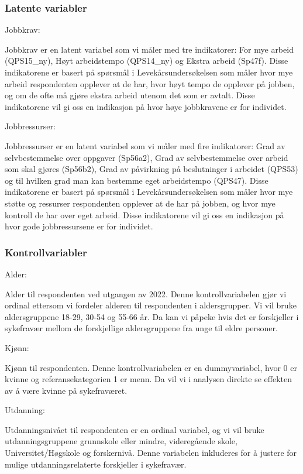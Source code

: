 \documentclass[
  12pt,
  a4paper,
  DIV=11,
  numbers=noendperiod]{scrartcl}
\begin{document}
\subsubsection{Latente variabler}\label{latente-variabler}

Jobbkrav:

Jobbkrav er en latent variabel som vi måler med tre indikatorer: For mye
arbeid (QPS15\_ny), Høyt arbeidstempo (QPS14\_ny) og Ekstra arbeid
(Sp47f). Disse indikatorene er basert på spørsmål i
Levekårsundersøkelsen som måler hvor mye arbeid respondenten opplever at
de har, hvor høyt tempo de opplever på jobben, og om de ofte må gjøre
ekstra arbeid utenom det som er avtalt. Disse indikatorene vil gi oss en
indikasjon på hvor høye jobbkravene er for individet.

Jobbressurser:

Jobbressurser er en latent variabel som vi måler med fire indikatorer:
Grad av selvbestemmelse over oppgaver (Sp56a2), Grad av selvbestemmelse
over arbeid som skal gjøres (Sp56b2), Grad av påvirkning på beslutninger
i arbeidet (QPS53) og til hvilken grad man kan bestemme eget
arbeidstempo (QPS47). Disse indikatorene er basert på spørsmål i
Levekårsundersøkelsen som måler hvor mye støtte og ressurser
respondenten opplever at de har på jobben, og hvor mye kontroll de har
over eget arbeid. Disse indikatorene vil gi oss en indikasjon på hvor
gode jobbressursene er for individet.

\subsubsection{Kontrollvariabler}\label{kontrollvariabler}

Alder:

Alder til respondenten ved utgangen av 2022. Denne kontrollvariabelen
gjør vi ordinal ettersom vi fordeler alderen til respondenten i
aldersgrupper. Vi vil bruke aldersgruppene 18-29, 30-54 og 55-66 år. Da
kan vi påpeke hvis det er forskjeller i sykefravær mellom de
forskjellige aldersgruppene fra unge til eldre personer.

Kjønn:

Kjønn til respondenten. Denne kontrollvariabelen er en dummyvariabel,
hvor 0 er kvinne og referansekategorien 1 er menn. Da vil vi i analysen
direkte se effekten av å være kvinne på sykefraværet.

Utdanning:

Utdanningsnivået til respondenten er en ordinal variabel, og vi vil
bruke utdanningsgruppene grunnskole eller mindre, videregående skole,
Universitet/Høgskole og forskernivå. Denne variabelen inkluderes for å
justere for mulige utdanningsrelaterte forskjeller i sykefravær.
\end{document}
